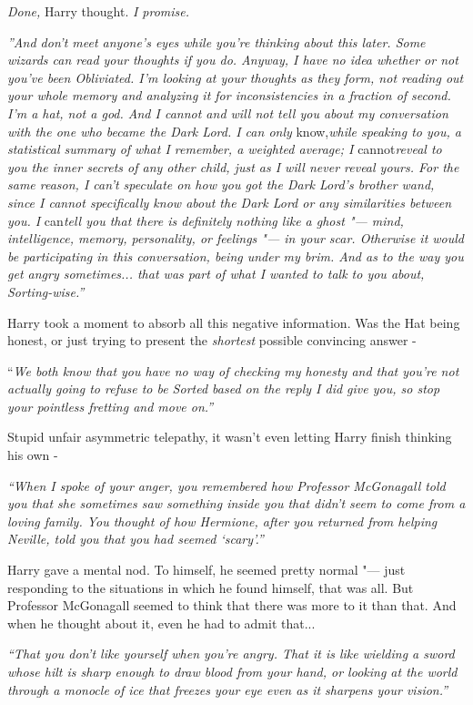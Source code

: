 \emph{Done,} Harry thought. \emph{I promise.}

\emph{''And don't meet anyone's eyes while you're thinking about this
later. Some wizards can read your thoughts if you do. Anyway, I have no
idea whether or not you've been Obliviated. I'm looking at your thoughts
as they form, not reading out your whole memory and analyzing it for
inconsistencies in a fraction of second. I'm a hat, not a god. And I
cannot and will not tell you about my conversation with the one who
became the Dark Lord. I can only} know,\emph{while speaking to you, a
statistical summary of what I remember, a weighted average; I}
cannot\emph{reveal to you the inner secrets of any other child, just as
I will never reveal yours. For the same reason, I can't speculate on how
you got the Dark Lord's brother wand, since I cannot specifically know
about the Dark Lord or any similarities between you. I} can\emph{tell
you that there is definitely nothing like a ghost "--- mind, intelligence,
memory, personality, or feelings "--- in your scar. Otherwise it would be
participating in this conversation, being under my brim. And as to the
way you get angry sometimes... that was part of what I wanted to
talk to you about, Sorting-wise.''}

Harry took a moment to absorb all this negative information. Was the Hat
being honest, or just trying to present the \emph{shortest} possible
convincing answer -

``\emph{We both know that you have no way of checking my honesty and that
you're not actually going to refuse to be Sorted based on the reply I
did give you, so stop your pointless fretting and move on.''}

Stupid unfair asymmetric telepathy, it wasn't even letting Harry finish
thinking his own -

\emph{``When I spoke of your anger, you remembered how Professor
McGonagall told you that she sometimes saw something inside you that
didn't seem to come from a loving family. You thought of how Hermione,
after you returned from helping Neville, told you that you had seemed
`scary'.''}

Harry gave a mental nod. To himself, he seemed pretty normal "--- just
responding to the situations in which he found himself, that was all.
But Professor McGonagall seemed to think that there was more to it than
that. And when he thought about it, even he had to admit that...

\emph{``That you don't like yourself when you're angry. That it is like
wielding a sword whose hilt is sharp enough to draw blood from your
hand, or looking at the world through a monocle of ice that freezes your
eye even as it sharpens your vision.''}

